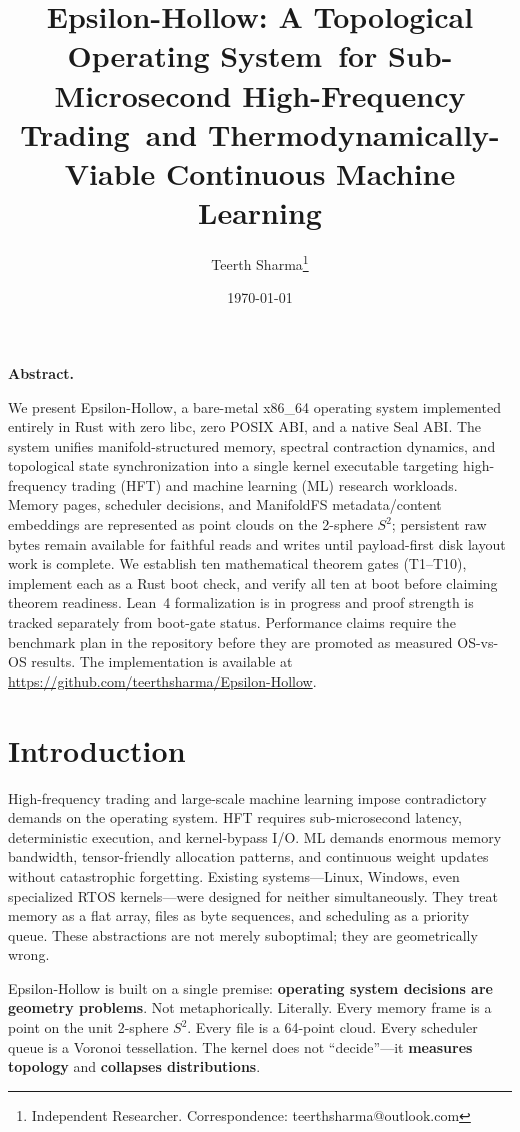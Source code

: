 \documentclass[11pt, a4paper]{article}
\title{%
  Epsilon-Hollow: A Topological Operating System\
  for Sub-Microsecond High-Frequency Trading\
  and Thermodynamically-Viable Continuous Machine Learning
}
\author{%
  Teerth Sharma\thanks{Independent Researcher. Correspondence: teerthsharma@outlook.com}%
}
\date{\today}
\renewenvironment{abstract}{%
  \textbf{Abstract.}%
  \ignorespaces%
}{\par\vspace{0.5em}}
\theoremstyle{proofform}
\numberwithin{innerpoints}{subsection}
\numberwithin{disproof}{subsection}
\theoremstyle{mathproof}
\begin{document}
\maketitle
\begin{abstract}
We present Epsilon-Hollow, a bare-metal x86\_64 operating system implemented entirely in Rust with zero libc, zero POSIX ABI, and a native Seal ABI. The system unifies manifold-structured memory, spectral contraction dynamics, and topological state synchronization into a single kernel executable targeting high-frequency trading (HFT) and machine learning (ML) research workloads. Memory pages, scheduler decisions, and ManifoldFS metadata/content embeddings are represented as point clouds on the 2-sphere $S^2$; persistent raw bytes remain available for faithful reads and writes until payload-first disk layout work is complete. We establish ten mathematical theorem gates (T1--T10), implement each as a Rust boot check, and verify all ten at boot before claiming theorem readiness. Lean~4 formalization is in progress and proof strength is tracked separately from boot-gate status. Performance claims require the benchmark plan in the repository before they are promoted as measured OS-vs-OS results. The implementation is available at \url{https://github.com/teerthsharma/Epsilon-Hollow}.
\end{abstract}

\linenumbers

\section{Introduction}
\label{sec:introduction}

High-frequency trading and large-scale machine learning impose contradictory demands on the operating system. HFT requires sub-microsecond latency, deterministic execution, and kernel-bypass I/O. ML demands enormous memory bandwidth, tensor-friendly allocation patterns, and continuous weight updates without catastrophic forgetting. Existing systems---Linux, Windows, even specialized RTOS kernels---were designed for neither simultaneously. They treat memory as a flat array, files as byte sequences, and scheduling as a priority queue. These abstractions are not merely suboptimal; they are geometrically wrong.

Epsilon-Hollow is built on a single premise: \textbf{operating system decisions are geometry problems}. Not metaphorically. Literally. Every memory frame is a point on the unit 2-sphere $S^2$. Every file is a 64-point cloud. Every scheduler queue is a Voronoi tessellation. The kernel does not ``decide''---it \textbf{measures topology} and \textbf{collapses distributions}.
\end{document}
